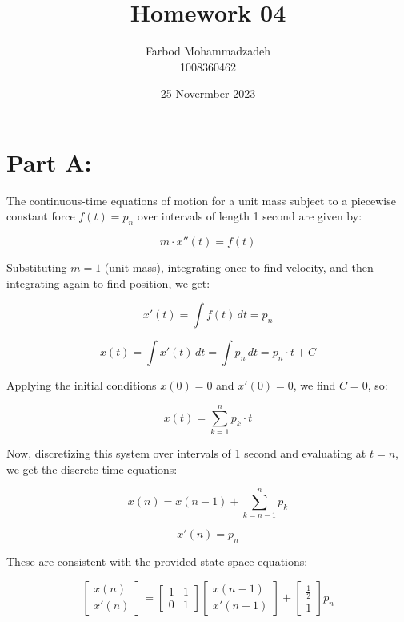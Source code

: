 \documentclass[20pt]{article}
\title{Homework 04}
\author{Farbod Mohammadzadeh\\1008360462}
\date{25 Novermber 2023}
\begin{document}
\Large
\maketitle

\newpage

\section*{Part A:}

The continuous-time equations of motion for a unit mass subject to a piecewise constant force \(f(t) = p_n\) over intervals of length 1 second are given by:

\[
    m \cdot x''(t) = f(t)
\]

Substituting \(m = 1\) (unit mass), integrating once to find velocity, and then integrating again to find position, we get:

\[
    x'(t) = \int f(t) \, dt = p_n
\]

\[
    x(t) = \int x'(t) \, dt = \int p_n \, dt = p_n \cdot t + C
\]

Applying the initial conditions \(x(0) = 0\) and \(x'(0) = 0\), we find \(C = 0\), so:

\[
    x(t) = \sum_{k=1}^n p_k \cdot t
\]

Now, discretizing this system over intervals of 1 second and evaluating at \(t = n\), we get the discrete-time equations:

\[
    x(n) = x(n-1) + \sum_{k=n-1}^n p_k
\]

\[
    x'(n) = p_n
\]

These are consistent with the provided state-space equations:

\[
    \begin{bmatrix}
        x(n) \\
        x'(n)
    \end{bmatrix}
    =
    \begin{bmatrix}
        1 & 1 \\
        0 & 1
    \end{bmatrix}
    \begin{bmatrix}
        x(n-1) \\
        x'(n-1)
    \end{bmatrix}
    +
    \begin{bmatrix}
        \frac{1}{2} \\
        1
    \end{bmatrix}
    p_n
\]

\newpage
\end{document}

